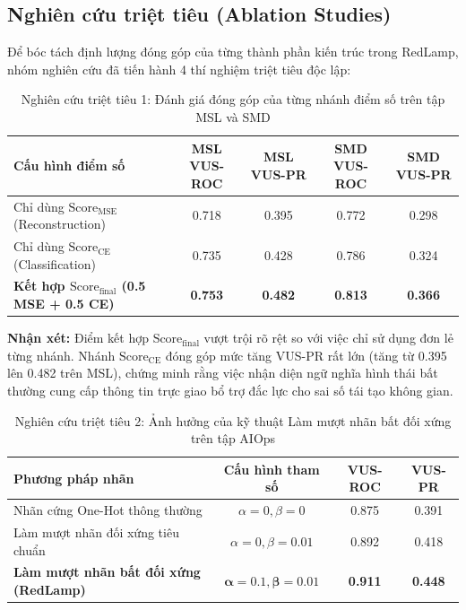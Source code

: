 \documentclass[11pt,journal,onecolumn]{IEEEtran}
\begin{document}
\subsection{Nghiên cứu triệt tiêu (Ablation Studies)}
\label{subsec:ablation_studies}
Để bóc tách định lượng đóng góp của từng thành phần kiến trúc trong RedLamp, nhóm nghiên cứu đã tiến hành 4 thí nghiệm triệt tiêu độc lập:

\begin{table}[htbp]
\centering
\caption{Nghiên cứu triệt tiêu 1: Đánh giá đóng góp của từng nhánh điểm số trên tập MSL và SMD}
\label{tab:ablation_branches}
\begin{tabular}{lcccc}
\toprule
\textbf{Cấu hình điểm số} & \textbf{MSL VUS-ROC} & \textbf{MSL VUS-PR} & \textbf{SMD VUS-ROC} & \textbf{SMD VUS-PR} \\
\midrule
Chỉ dùng $\text{Score}_{\text{MSE}}$ (Reconstruction) & 0.718 & 0.395 & 0.772 & 0.298 \\
Chỉ dùng $\text{Score}_{\text{CE}}$ (Classification) & 0.735 & 0.428 & 0.786 & 0.324 \\
\textbf{Kết hợp $\text{Score}_{\text{final}}$ (0.5 MSE + 0.5 CE)} & \textbf{0.753} & \textbf{0.482} & \textbf{0.813} & \textbf{0.366} \\
\bottomrule
\end{tabular}
\end{table}

\textbf{Nhận xét:} Điểm kết hợp $\text{Score}_{\text{final}}$ vượt trội rõ rệt so với việc chỉ sử dụng đơn lẻ từng nhánh. Nhánh $\text{Score}_{\text{CE}}$ đóng góp mức tăng VUS-PR rất lớn (tăng từ 0.395 lên 0.482 trên MSL), chứng minh rằng việc nhận diện ngữ nghĩa hình thái bất thường cung cấp thông tin trực giao bổ trợ đắc lực cho sai số tái tạo không gian.

\begin{table}[htbp]
\centering
\caption{Nghiên cứu triệt tiêu 2: Ảnh hưởng của kỹ thuật Làm mượt nhãn bất đối xứng trên tập AIOps}
\label{tab:ablation_smoothing}
\begin{tabular}{lccc}
\toprule
\textbf{Phương pháp nhãn} & \textbf{Cấu hình tham số} & \textbf{VUS-ROC} & \textbf{VUS-PR} \\
\midrule
Nhãn cứng One-Hot thông thường & $\alpha = 0, \beta = 0$ & 0.875 & 0.391 \\
Làm mượt nhãn đối xứng tiêu chuẩn & $\alpha = 0, \beta = 0.01$ & 0.892 & 0.418 \\
\textbf{Làm mượt nhãn bất đối xứng (RedLamp)} & $\mathbf{\alpha = 0.1, \beta = 0.01}$ & \textbf{0.911} & \textbf{0.448} \\
\bottomrule
\end{tabular}
\end{table}
\end{document}
